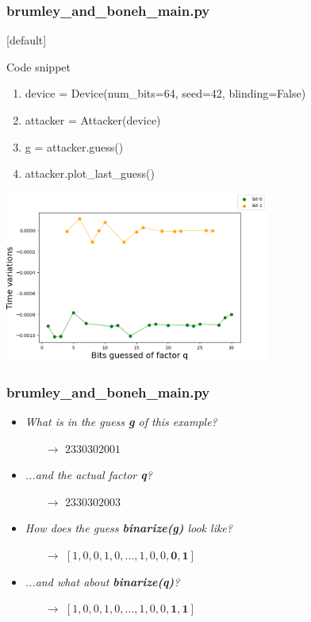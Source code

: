 \documentclass{beamer}
\begin{document}
\begin{frame}
\frametitle{brumley\_and\_boneh\_main.py}
[default]

{\scriptsize
\begin{block}{Code snippet}
  \begin{enumerate}
      \item device = Device(num\_bits=64, seed=42, blinding=False)
      \item attacker = Attacker(device)
      \item g = attacker.guess()
      \item attacker.plot\_last\_guess()
  \end{enumerate}
\end{block}
}

\center
\includegraphics[width=0.65\textwidth]{figures/brumley_and_boneh_output_example}

\end{frame}
\begin{frame}
\frametitle{brumley\_and\_boneh\_main.py}

\begin{itemize}
  \item \emph{What is in the guess \textbf{g} of this example?}
  \begin{itemize}
    \item[$\rightarrow$] $2330302001$
  \end{itemize}
  \item \emph{...and the actual factor \textbf{q}?}
  \begin{itemize}
    \item[$\rightarrow$] $2330302003$
  \end{itemize}
  \item \emph{How does the guess \textbf{binarize(g)} look like?}
  \begin{itemize}
    \item[$\rightarrow$] $[1, 0, 0, 1, 0, \dots, 1, 0, 0, \mathbf{0, 1}]$
  \end{itemize}
  \item \emph{...and what about \textbf{binarize(q)}?}
  \begin{itemize}
    \item[$\rightarrow$] $[1, 0, 0, 1, 0, \dots, 1, 0, 0, \mathbf{1, 1}]$
  \end{itemize}
\end{itemize}

\end{frame}
\end{document}
